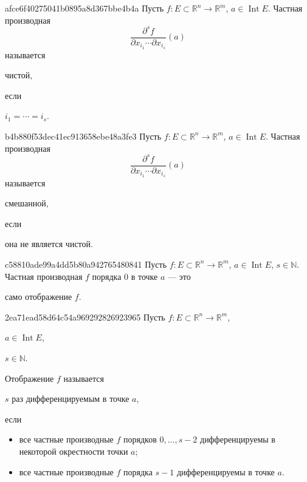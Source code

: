\begin{note}{afce6f40275041b0895a8d367bbe4b4a}
    Пусть \({ f : E \subset \mathbb R^{n} \to \mathbb R^{m} }\),\: \({ a \in \operatorname{Int} E }\).
    Частная производная
    \[
        \frac{\partial^{s} f}{\partial x_{i_1} \cdots \partial x_{i_s}}(a)
    \]
    называется \begin{icloze}{1}чистой,\end{icloze} если \begin{icloze}{2}\({ i_1 = \cdots = i_s }\).\end{icloze}
\end{note}

\begin{note}{b4b880f53dec41ec913658ebe48a3fe3}
    Пусть \({ f : E \subset \mathbb R^{n} \to \mathbb R^{m} }\),\: \({ a \in \operatorname{Int} E }\).
    Частная производная
    \[
        \frac{\partial^{s} f}{\partial x_{i_1} \cdots \partial x_{i_s}}(a)
    \]
    называется \begin{icloze}{1}смешанной,\end{icloze} если \begin{icloze}{2}она не является чистой.\end{icloze}
\end{note}

\begin{note}{c58810ade99a4dd5b80a942765480841}
    Пусть \({ f : E \subset \mathbb R^{n} \to \mathbb R^{m} }\),\: \({ a \in \operatorname{Int} E }\),\: \({ s \in \mathbb N }\).
    Частная производная \({ f }\) порядка \({ 0 }\) в точке \({ a }\) --- это \begin{icloze}{1}само отображение \({ f }\).\end{icloze}
\end{note}

\begin{note}{2ea71ead58d64c54a969292826923965}
    Пусть \({ f : E \subset \mathbb R^{n} \to \mathbb R^{m} }\),\: \begin{icloze}{4}\({ a \in \operatorname{Int} E }\),\end{icloze}\: \begin{icloze}{3}\({ s \in \mathbb N }\).\end{icloze}
    Отображение \({ f }\) называется \begin{icloze}{3}\({ s }\) раз дифференцируемым в точке \({ a }\),\end{icloze} если
    \begin{itemize}
        \item \begin{icloze}{1}все частные производные \({ f }\) порядков \({ 0, \ldots, s - 2 }\) дифференцируемы в некоторой окрестности точки \({ a }\);\end{icloze}
        \item \begin{icloze}{2}все частные производные \({ f }\) порядка \({ s - 1 }\) дифференцируемы в точке \({ a }\).\end{icloze}
    \end{itemize}
\end{note}

